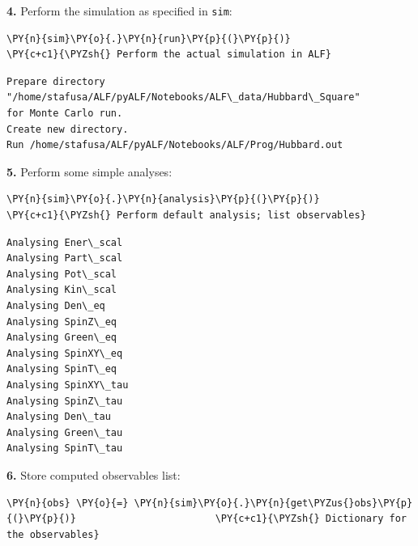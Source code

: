     \textbf{4.} Perform the simulation as specified in \texttt{sim}:

    \begin{tcolorbox}[breakable, size=fbox, boxrule=1pt, pad at break*=1mm,colback=cellbackground, colframe=cellborder]
\begin{Verbatim}[commandchars=\\\{\}]
\PY{n}{sim}\PY{o}{.}\PY{n}{run}\PY{p}{(}\PY{p}{)}                                  \PY{c+c1}{\PYZsh{} Perform the actual simulation in ALF}
\end{Verbatim}
\end{tcolorbox}

    \begin{Verbatim}[commandchars=\\\{\}]
Prepare directory "/home/stafusa/ALF/pyALF/Notebooks/ALF\_data/Hubbard\_Square"
for Monte Carlo run.
Create new directory.
Run /home/stafusa/ALF/pyALF/Notebooks/ALF/Prog/Hubbard.out
    \end{Verbatim}

    \textbf{5.} Perform some simple analyses:

    \begin{tcolorbox}[breakable, size=fbox, boxrule=1pt, pad at break*=1mm,colback=cellbackground, colframe=cellborder]
\begin{Verbatim}[commandchars=\\\{\}]
\PY{n}{sim}\PY{o}{.}\PY{n}{analysis}\PY{p}{(}\PY{p}{)}                             \PY{c+c1}{\PYZsh{} Perform default analysis; list observables}
\end{Verbatim}
\end{tcolorbox}

    \begin{Verbatim}[commandchars=\\\{\}]
Analysing Ener\_scal
Analysing Part\_scal
Analysing Pot\_scal
Analysing Kin\_scal
Analysing Den\_eq
Analysing SpinZ\_eq
Analysing Green\_eq
Analysing SpinXY\_eq
Analysing SpinT\_eq
Analysing SpinXY\_tau
Analysing SpinZ\_tau
Analysing Den\_tau
Analysing Green\_tau
Analysing SpinT\_tau
    \end{Verbatim}

    \textbf{6.} Store computed observables list:

    \begin{tcolorbox}[breakable, size=fbox, boxrule=1pt, pad at break*=1mm,colback=cellbackground, colframe=cellborder]
\begin{Verbatim}[commandchars=\\\{\}]
\PY{n}{obs} \PY{o}{=} \PY{n}{sim}\PY{o}{.}\PY{n}{get\PYZus{}obs}\PY{p}{(}\PY{p}{)}                        \PY{c+c1}{\PYZsh{} Dictionary for the observables}
\end{Verbatim}
\end{tcolorbox}

